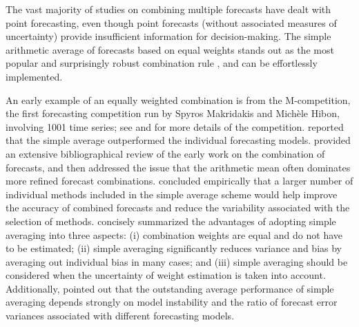 \documentclass[a4paper,11pt]{article}
\begin{document}
The vast majority of studies on combining multiple forecasts have dealt with point forecasting, even though point forecasts (without associated measures of uncertainty) provide insufficient information for decision-making. The simple arithmetic average of forecasts based on equal weights stands out as the most popular and surprisingly robust combination rule \citep[see][]{Bunn1985-vo,Clemen1986-pd,Stock2003-sp,Genre2013-ut}, and can be effortlessly implemented.

An early example of an equally weighted combination is from the M-competition, the first forecasting competition run by Spyros Makridakis and Mich{\`e}le Hibon, involving 1001 time series; see \citet{Makridakis1982-hb} and \citet{Hyndman2020-bh} for more details of the competition. \citet{Makridakis1982-hb} reported that the simple average outperformed the individual forecasting models. \citet{Clemen1989-fb} provided an extensive bibliographical review of the early work on the combination of forecasts, and then addressed the issue that the arithmetic mean often dominates more refined forecast combinations. \citet{Makridakis1983-hg} concluded empirically that a larger number of individual methods included in the simple average scheme would help improve the accuracy of combined forecasts and reduce the variability associated with the selection of methods. \citet{Palm1992-im} concisely summarized the advantages of adopting simple averaging into three aspects: (i) combination weights are equal and do not have to be estimated; (ii) simple averaging significantly reduces variance and bias by averaging out individual bias in many cases; and (iii) simple averaging should be considered when the uncertainty of weight estimation is taken into account. Additionally, \citet{Timmermann2006-en} pointed out that the outstanding average performance of simple averaging depends strongly on model instability and the ratio of forecast error variances associated with different forecasting models.
\end{document}
